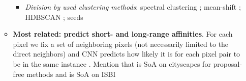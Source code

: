 \begin{itemize}
\begin{itemize}
\begin{itemize}

\item \emph{Division by used clustering methods}: spectral clustering \cite{liang2018proposal}; mean-shift \cite{kong2018recurrent}; HDBSCAN \cite{}; seeds \cite{fathi2017semantic} 
\end{itemize}




\item \textbf{Most related: predict short- and long-range affinities}. For each pixel we fix a set of neighboring pixels (not necessarily limited to the direct neighbors) and CNN predicts how likely it is for each pixel pair to be in the same instance \cite{liu2018affinity,wolf2018mutex,lee2017superhuman,xie2015holistically,Maire_2016_CVPR}. Mention that  \cite{liu2018affinity} is SoA on cityscapes for proposal-free methods and \cite{wolf2018mutex} is SoA on ISBI

\end{itemize}




\end{itemize}
